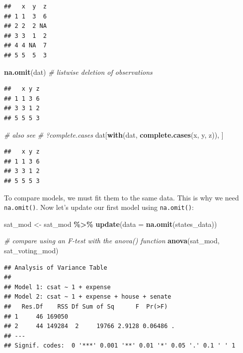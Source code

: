 \documentclass[
]{book}
\newenvironment{Shaded}{\begin{snugshade}}{\end{snugshade}}
\newcommand{\CommentTok}[1]{\textcolor[rgb]{0.56,0.35,0.01}{\textit{#1}}}
\newcommand{\DataTypeTok}[1]{\textcolor[rgb]{0.13,0.29,0.53}{#1}}
\newcommand{\KeywordTok}[1]{\textcolor[rgb]{0.13,0.29,0.53}{\textbf{#1}}}
\newcommand{\NormalTok}[1]{#1}
\newcommand{\OperatorTok}[1]{\textcolor[rgb]{0.81,0.36,0.00}{\textbf{#1}}}
\newcommand{\StringTok}[1]{\textcolor[rgb]{0.31,0.60,0.02}{#1}}
\begin{document}
\begin{verbatim}
##   x  y  z
## 1 1  3  6
## 2 2  2 NA
## 3 3  1  2
## 4 4 NA  7
## 5 5  5  3
\end{verbatim}

\begin{Shaded}
\begin{Highlighting}[]
\KeywordTok{na.omit}\NormalTok{(dat) }\CommentTok{\# listwise deletion of observations}
\end{Highlighting}
\end{Shaded}

\begin{verbatim}
##   x y z
## 1 1 3 6
## 3 3 1 2
## 5 5 5 3
\end{verbatim}

\begin{Shaded}
\begin{Highlighting}[]
\CommentTok{\# also see}
\CommentTok{\# ?complete.cases}
\NormalTok{dat[}\KeywordTok{with}\NormalTok{(dat, }\KeywordTok{complete.cases}\NormalTok{(x, y, z)), ]}
\end{Highlighting}
\end{Shaded}

\begin{verbatim}
##   x y z
## 1 1 3 6
## 3 3 1 2
## 5 5 5 3
\end{verbatim}

To compare models, we must fit them to the same data. This is why we need \texttt{na.omit()}.
Now let's update our first model using \texttt{na.omit()}:

\begin{Shaded}
\begin{Highlighting}[]
\NormalTok{  sat\_mod \textless{}{-}}\StringTok{ }
\StringTok{      }\NormalTok{sat\_mod }\OperatorTok{\%\textgreater{}\%}
\StringTok{      }\KeywordTok{update}\NormalTok{(}\DataTypeTok{data =} \KeywordTok{na.omit}\NormalTok{(states\_data))}

  \CommentTok{\# compare using an F{-}test with the anova() function}
  \KeywordTok{anova}\NormalTok{(sat\_mod, sat\_voting\_mod)}
\end{Highlighting}
\end{Shaded}

\begin{verbatim}
## Analysis of Variance Table
## 
## Model 1: csat ~ 1 + expense
## Model 2: csat ~ 1 + expense + house + senate
##   Res.Df    RSS Df Sum of Sq      F  Pr(>F)  
## 1     46 169050                              
## 2     44 149284  2     19766 2.9128 0.06486 .
## ---
## Signif. codes:  0 '***' 0.001 '**' 0.01 '*' 0.05 '.' 0.1 ' ' 1
\end{verbatim}
\end{document}
